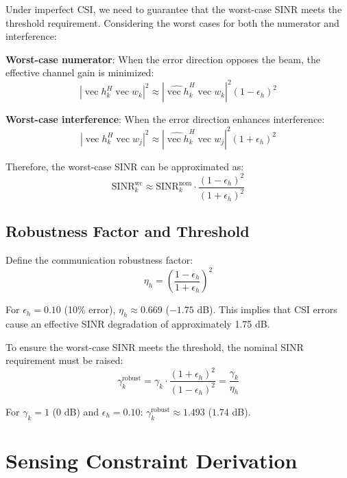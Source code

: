 \documentclass[12pt,a4paper]{article}
\DeclareMathOperator{\vect}{vec}
\begin{document}
Under imperfect CSI, we need to guarantee that the worst-case SINR meets the threshold requirement. Considering the worst cases for both the numerator and interference:

\textbf{Worst-case numerator}: When the error direction opposes the beam, the effective channel gain is minimized:
\begin{equation}
|\vect{h}_k^H \vect{w}_k|^2 \approx |\hat{\vect{h}}_k^H \vect{w}_k|^2 (1 - \epsilon_h)^2
\end{equation}

\textbf{Worst-case interference}: When the error direction enhances interference:
\begin{equation}
|\vect{h}_k^H \vect{w}_j|^2 \approx |\hat{\vect{h}}_k^H \vect{w}_j|^2 (1 + \epsilon_h)^2
\end{equation}

Therefore, the worst-case SINR can be approximated as:
\begin{equation}
\text{SINR}_k^{\text{wc}} \approx \text{SINR}_k^{\text{nom}} \cdot \frac{(1-\epsilon_h)^2}{(1+\epsilon_h)^2} \tag{2}
\end{equation}

\subsection{Robustness Factor and Threshold}

Define the communication robustness factor:
\begin{equation}
\eta_h = \left(\frac{1-\epsilon_h}{1+\epsilon_h}\right)^2 \tag{3}
\end{equation}

For $\epsilon_h = 0.10$ (10\% error), $\eta_h \approx 0.669$ ($-1.75$ dB). This implies that CSI errors cause an effective SINR degradation of approximately 1.75 dB.

To ensure the worst-case SINR meets the threshold, the nominal SINR requirement must be raised:
\begin{equation}
\gamma_k^{\text{robust}} = \gamma_k \cdot \frac{(1+\epsilon_h)^2}{(1-\epsilon_h)^2} = \frac{\gamma_k}{\eta_h} \tag{4}
\end{equation}

For $\gamma_k = 1$ (0 dB) and $\epsilon_h = 0.10$: $\gamma_k^{\text{robust}} \approx 1.493$ ($1.74$ dB).

\section{Sensing Constraint Derivation}
\end{document}
